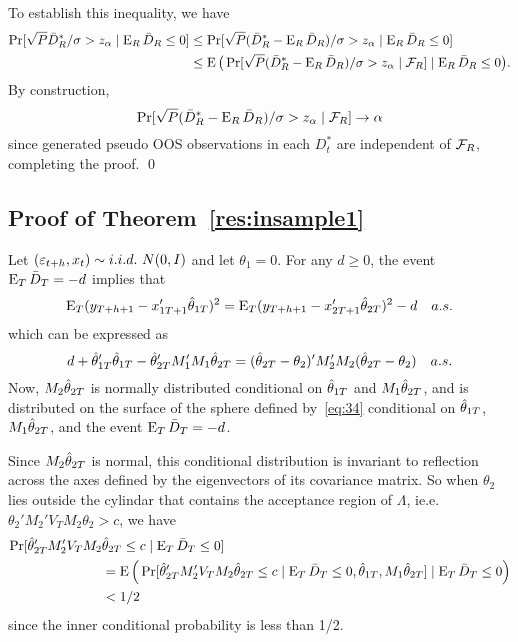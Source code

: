\documentclass[12pt]{article}
\begin{document}
To establish this inequality, we have
\begin{align*}
  \Pr[\sqrt{P} \bar{D}_{R}^* / \sigma > z_\alpha \mid \operatorname{E}_R \bar{D}_{R} \leq 0]
  &\leq \Pr[\sqrt{P} (\bar{D}_{R}^* - \operatorname{E}_R \bar{D}_{R}) / \sigma > z_\alpha
  \mid \operatorname{E}_R \bar{D}_{R} \leq 0] \\
  &\leq \operatorname{E}\big(
  \Pr[\sqrt{P} (\bar{D}_{R}^* - \operatorname{E}_R \bar{D}_{R}) / \sigma > z_\alpha \mid \mathcal{F}_R]
  \mid \operatorname{E}_R \bar{D}_{R} \leq 0\big).
\end{align*}
By construction,
\begin{equation*}
  \Pr[\sqrt{P} (\bar{D}_{R}^* - \operatorname{E}_R \bar{D}_{R}) / \sigma > z_\alpha \mid \mathcal{F}_R]
  \to \alpha
\end{equation*}
since generated pseudo OOS observations in each $D_t^*$ are
independent of $\mathcal{F}_R$, completing the proof.
\qed

\subsection*{Proof of Theorem~\ref{res:insample1}}

Let $(\e_{t+h}, x_{t}) \sim i.i.d.\ N(0,I)$ and let $\theta_1 = 0$.
For any $d \geq 0$, the event $\operatorname{E}_T \bar{D}_{T} = -d$ implies that
\begin{equation*}
  \operatorname{E}_T (y_{T+h+1} - x_{1T+1}'\hat\theta_{1T})^2
  = \operatorname{E}_T (y_{T+h+1} - x_{2T+1}'\hat\theta_{2T})^2 - d \quad a.s.
\end{equation*}
which can be expressed as
\begin{equation}\label{eq:34}
  d + \hat\theta_{1T}'\hat\theta_{1T} - \hat\theta_{2T}'M_1'M_1\hat\theta_{2T}
  = (\hat\theta_{2T} - \theta_2)' M_2'M_2 (\hat\theta_{2T} - \theta_2) \quad a.s.
\end{equation}
Now, $M_2 \hat\theta_{2T}$ is normally distributed conditional
on $\hat\theta_{1T}$ and $M_1 \hat\theta_{2T}$, and is distributed on the surface of
the sphere defined by~\eqref{eq:34} conditional on $\hat\theta_{1T}$, $M_1
\hat\theta_{2T}$, and the event $\operatorname{E}_T \bar{D}_{T} = -d$.

Since $M_2 \hat\theta_{2T}$ is normal, this conditional distribution is
invariant to reflection across the axes defined by the eigenvectors of
its covariance matrix. So when $\theta_2$ lies outside the cylindar
that contains the acceptance region of $\Lambda$, ie.e. $\theta_2'M_2'
V_T M_2 \theta_2 > c$, we have
\begin{align*}
  \Pr[ \hat\theta_{2T}'M_2' V_T M_2 &\hat\theta_{2T} \leq c \mid \operatorname{E}_T \bar{D}_{T} \leq 0] \\
  &= \operatorname{E}\Big( \Pr[ \hat\theta_{2T}'M_2' V_T M_2 \hat\theta_{2T} \leq c
  \mid \operatorname{E}_T \bar{D}_{T} \leq 0, \hat\theta_{1T}, M_1 \hat\theta_{2T}]
  \mid \operatorname{E}_T \bar{D}_{T} \leq 0 \Big) \\
  & < 1/2
\end{align*}
since the inner conditional probability is less than 1/2.
\end{document}
